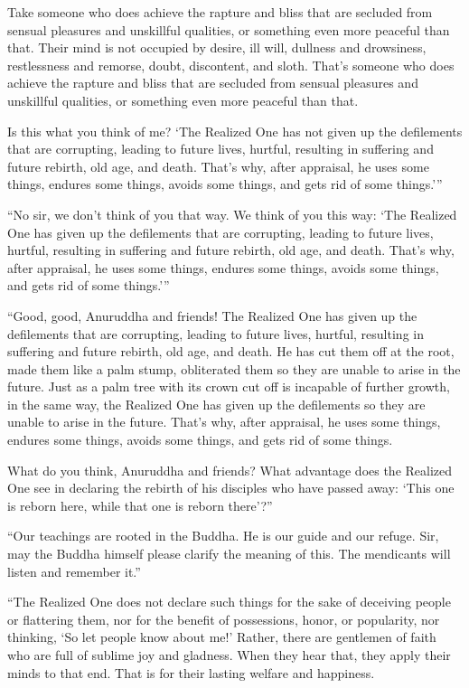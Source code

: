 \documentclass[12pt,openany]{book}%
\begin{document}
Take someone who does achieve the rapture and bliss that are secluded from sensual pleasures and unskillful qualities, or something even more peaceful than that. Their mind is not occupied by desire, ill will, dullness and drowsiness, restlessness and remorse, doubt, discontent, and sloth. That’s someone who does achieve the rapture and bliss that are secluded from sensual pleasures and unskillful qualities, or something even more peaceful than that. 

Is this what you think of me? ‘The Realized One has not given up the defilements that are corrupting, leading to future lives, hurtful, resulting in suffering and future rebirth, old age, and death. That’s why, after appraisal, he uses some things, endures some things, avoids some things, and gets rid of some things.’” 

“No sir, we don’t think of you that way. We think of you this way: ‘The Realized One has given up the defilements that are corrupting, leading to future lives, hurtful, resulting in suffering and future rebirth, old age, and death. That’s why, after appraisal, he uses some things, endures some things, avoids some things, and gets rid of some things.’” 

“Good, good, Anuruddha and friends! The Realized One has given up the defilements that are corrupting, leading to future lives, hurtful, resulting in suffering and future rebirth, old age, and death. He has cut them off at the root, made them like a palm stump, obliterated them so they are unable to arise in the future. Just as a palm tree with its crown cut off is incapable of further growth, in the same way, the Realized One has given up the defilements so they are unable to arise in the future. That’s why, after appraisal, he uses some things, endures some things, avoids some things, and gets rid of some things. 

What do you think, Anuruddha and friends? What advantage does the Realized One see in declaring the rebirth of his disciples who have passed away: ‘This one is reborn here, while that one is reborn there’?” 

“Our teachings are rooted in the Buddha. He is our guide and our refuge. Sir, may the Buddha himself please clarify the meaning of this. The mendicants will listen and remember it.” 

“The Realized One does not declare such things for the sake of deceiving people or flattering them, nor for the benefit of possessions, honor, or popularity, nor thinking, ‘So let people know about me!’ Rather, there are gentlemen of faith who are full of sublime joy and gladness. When they hear that, they apply their minds to that end. That is for their lasting welfare and happiness. 
\end{document}
